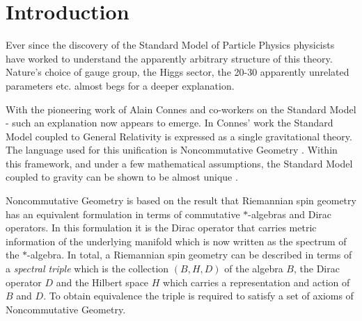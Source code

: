 \documentclass[12pt]{article}
\begin{document}
\newpage
\tableofcontents

\newpage
\section{Introduction}

Ever since the discovery of the Standard Model of Particle Physics physicists have worked to understand the apparently arbitrary structure of this theory. Nature's choice of gauge group, the Higgs sector, the 20-30 apparently unrelated parameters etc. almost begs for a deeper explanation.

With the pioneering work of Alain Connes and co-workers on the Standard Model \cite{ConnesBook}-\cite{Chamseddine:2007ia} such an explanation now appears to emerge. In Connes' work the Standard Model coupled to General Relativity is expressed as a single gravitational theory. 
The language used for this unification is Noncommutative Geometry \cite{ConnesBook}.
Within this framework, and under a few mathematical assumptions, the Standard Model coupled to gravity can be shown to be almost unique \cite{Chamseddine:2007hz,Chamseddine:2007ia}.


Noncommutative Geometry is based on the result \cite{ConnesBook,Rennie:2006pi} that Riemannian spin geometry has an equivalent formulation in terms of commutative $\ast$-algebras and Dirac operators. In this formulation it is the Dirac operator that carries metric information of the underlying manifold which is now written as the spectrum of the $\ast$-algebra. In total, a Riemannian spin geometry can be described in terms of a {\it spectral triple} which is the collection $(B,H,D)$ of the algebra $B$, the Dirac operator $D$ and the Hilbert space $H$ which carries a representation and action of $B$ and $D$. To obtain equivalence the triple is required to satisfy a set of axioms of Noncommutative Geometry.
\end{document}
